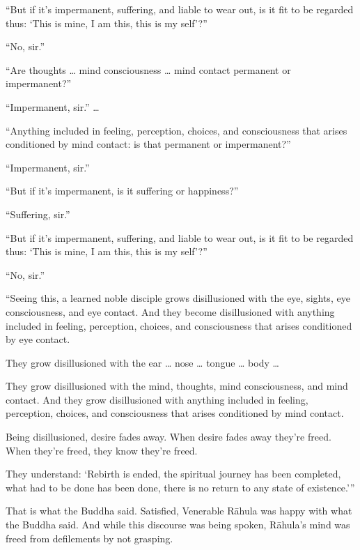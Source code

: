 \documentclass[12pt,openany]{book}%
\begin{document}
“But if it’s impermanent, suffering, and liable to wear out, is it fit to be regarded thus: ‘This is mine, I am this, this is my self’?” 

“No, sir.” 

“Are thoughts … mind consciousness … mind contact permanent or impermanent?” 

“Impermanent, sir.” … 

“Anything included in feeling, perception, choices, and consciousness that arises conditioned by mind contact: is that permanent or impermanent?” 

“Impermanent, sir.” 

“But if it’s impermanent, is it suffering or happiness?” 

“Suffering, sir.” 

“But if it’s impermanent, suffering, and liable to wear out, is it fit to be regarded thus: ‘This is mine, I am this, this is my self’?” 

“No, sir.” 

“Seeing this, a learned noble disciple grows disillusioned with the eye, sights, eye consciousness, and eye contact. And they become disillusioned with anything included in feeling, perception, choices, and consciousness that arises conditioned by eye contact. 

They grow disillusioned with the ear … nose … tongue … body … 

They grow disillusioned with the mind, thoughts, mind consciousness, and mind contact. And they grow disillusioned with anything included in feeling, perception, choices, and consciousness that arises conditioned by mind contact. 

Being disillusioned, desire fades away. When desire fades away they’re freed. When they’re freed, they know they’re freed. 

They understand: ‘Rebirth is ended, the spiritual journey has been completed, what had to be done has been done, there is no return to any state of existence.’” 

That is what the Buddha said. Satisfied, Venerable \textsanskrit{Rāhula} was happy with what the Buddha said. And while this discourse was being spoken, \textsanskrit{Rāhula}’s mind was freed from defilements by not grasping. 
\end{document}
